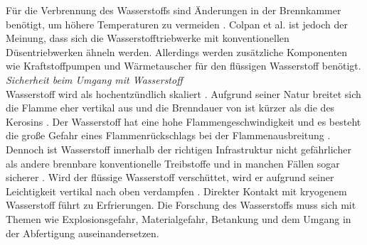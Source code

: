 %
%
%
Für die Verbrennung des Wasserstoffs sind Änderungen in der Brennkammer benötigt, um höhere Temperaturen zu vermeiden \cite{khandelwal2013hydrogen}.
Colpan et al. \cite{colpan2022fuel} ist jedoch der Meinung, dass sich die Wasserstofftriebwerke mit konventionellen Düsentriebwerken ähneln werden. 
Allerdings werden zusätzliche Komponenten wie Kraftstoffpumpen und Wärmetauscher für den flüssigen Wasserstoff benötigt.
%
%
%
%
\textit{Sicherheit beim Umgang mit Wasserstoff}\\
Wasserstoff wird als hochentzündlich skaliert \cite{dalmia2022powering}. Aufgrund seiner Natur breitet sich die Flamme eher 
vertikal aus und die Brenndauer von  ist kürzer als die des Kerosins \cite{colpan2022fuel}.
Der Wasserstoff hat eine hohe Flammengeschwindigkeit und es besteht die große Gefahr eines Flammenrückschlags bei der Flammenausbreitung \cite{khandelwal2013hydrogen}.
Dennoch ist Wasserstoff innerhalb der richtigen Infrastruktur nicht gefährlicher als andere brennbare konventionelle Treibstoffe und in manchen 
Fällen sogar sicherer \cite{khandelwal2013hydrogen}. 
Wird der flüssige Wasserstoff verschüttet, wird er aufgrund seiner Leichtigkeit vertikal nach oben verdampfen \cite{colpan2022fuel}. 
Direkter Kontakt mit kryogenem Wasserstoff führt zu Erfrierungen.
Die Forschung des Wasserstoffs muss sich mit Themen wie Explosionsgefahr, Materialgefahr, Betankung und 
dem Umgang in der Abfertigung auseinandersetzen. 

